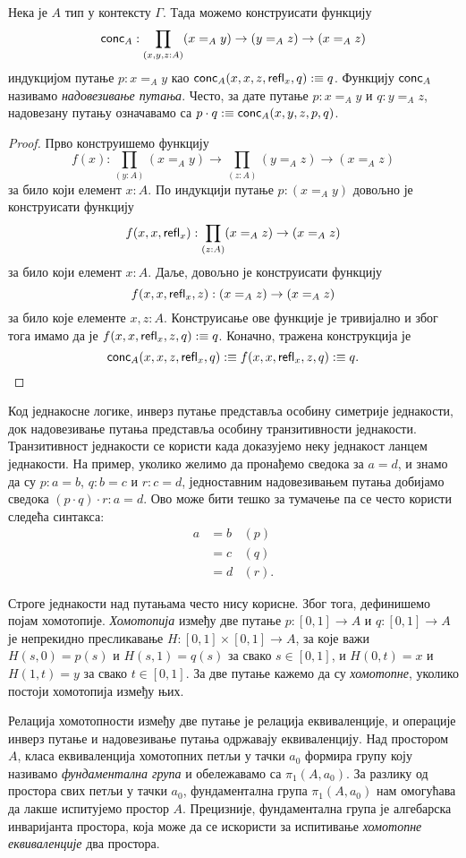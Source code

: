 \documentclass[12pt,oneside]{memoir}
\begin{document}
\begin{lemma}
    Нека је $A$ тип у контексту $\Gamma$. Тада можемо конструисати функцију \[\mathsf{conc}_{A} : \prod_{(x, y, z : A)} (x =_A y) \to (y =_A z) \to (x =_A z)\] индукцијом путање $p : x =_A y$ као $\mathsf{conc}_{A} (x, x, z, \mathsf{refl}_{x}, q) :\equiv q$. Функцију $\mathsf{conc}_{A}$ називамо \emph{надовезивање путања}. Често, за дате путање $p : x =_A y$ и $q : y =_A z$, надовезану путању означавамо са $p \cdot q :\equiv \mathsf{conc}_{A} (x, y, z, p, q)$.
\end{lemma}
\begin{proof}
    Прво конструишемо функцију
    \[f(x) : \prod_{(y : A)} (x =_A y) \to \prod_{(z : A)} (y =_A z) \to (x =_A z)\] за било који елемент $x : A$. По индукцији путање $p : (x =_A y)$ довољно је конструисати функцију \[ f(x, x, \mathsf{refl}_{x}) : \prod_{(z : A)} (x =_A z) \to (x =_A z) \] за било који елемент $x : A$. Даље, довољно је конструисати функцију \[ f(x, x, \mathsf{refl}_{x}, z) : (x =_A z) \to (x =_A z) \] за било које елементе $x, z : A$. Конструисање ове функције је тривијално и због тога имамо да је $f(x, x, \mathsf{refl}_{x}, z, q) :\equiv q$. Коначно, тражена конструкција је \[\mathsf{conc}_{A}(x, x, z, \mathsf{refl}_{x}, q) :\equiv f(x, x, \mathsf{refl}_{x}, z, q) :\equiv q. \]
\end{proof}

Код једнакосне логике, инверз путање представља особину симетрије једнакости, док надовезивање путања представља особину транзитивности једнакости. Транзитивност једнакости се користи када доказујемо неку једнакост ланцем једнакости. На пример, уколико желимо да пронађемо сведока за $a = d$, и знамо да су $p : a = b$, $q : b = c$ и $r : c = d$, једноставним надовезивањем путања добијамо сведока $(p \cdot q) \cdot r : a = d$. Ово може бити тешко за тумачење па се често користи следећа синтакса:
\begin{align*}
    a &= b & (p) \\
      &= c & (q) \\
      &= d & (r).
\end{align*}

Строге једнакости над путањама често нису корисне. Због тога, дефинишемо појам хомотопије. \emph{Хомотопија} између две путање $p : [0, 1] \to A$ и $q : [0, 1] \to A$ је непрекидно пресликавање $H : [0, 1] \times [0, 1] \to A$, за које важи $H(s, 0) = p(s)$ и $H(s, 1) = q(s)$ за свако $s \in [0, 1]$, и
$H(0, t) = x$ и $H(1, t) = y$ за свако $t \in [0, 1]$. За две путање кажемо да су \emph{хомотопне}, уколико постоји хомотопија између њих.

Релација хомотопности између две путање је релација еквиваленције, и операције инверз путање и надовезивање путања одржавају еквиваленцију. Над простором $A$, класа еквиваленција хомотопних петљи у тачки $a_0$ формира групу коју називамо \emph{фундаментална група} и обележавамо са $\pi_1(A, a_0)$. За разлику од простора свих петљи у тачки $a_0$, фундаментална група $\pi_1(A, a_0)$ нам омогућава да лакше испитујемо простор $A$. Прецизније, фундаментална група је алгебарска инваријанта
простора, која може да се искористи за испитивање \emph{хомотопне еквиваленције} два простора.
\end{document}
